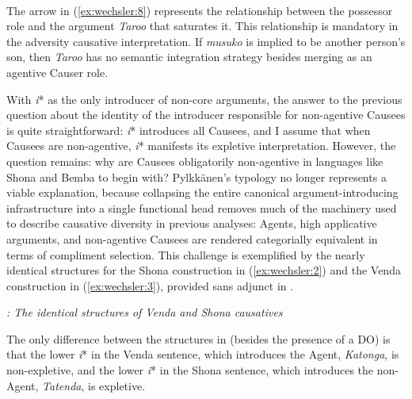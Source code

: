 \documentclass[output=paper]{langscibook}
\begin{document}
\ea\label{ex:wechsler:8}
 \\
\z
                  

The arrow in (\ref{ex:wechsler:8}) represents the relationship between the possessor role and the argument \textit{Taroo} that saturates it. This relationship is mandatory in the adversity causative interpretation. If \textit{musuko} is implied to be another person’s son, then \textit{Taroo} has no semantic integration strategy besides merging as an agentive Causer role. 

With \textit{i}* as the only introducer of non-core arguments, the answer to the previous question about the identity of the introducer responsible for non-agentive Causees is quite straightforward: \textit{i}* introduces all Causees, and I assume that when Causees are non-agentive, \textit{i}* manifests its expletive interpretation. However, the question remains: why are Causees obligatorily non-agentive in languages like Shona and Bemba to begin with? Pylkkänen’s typology no longer represents a viable explanation, because collapsing the entire canonical argument-introducing infrastructure into a single functional head removes much of the machinery used to describe causative diversity in previous analyses: Agents, high applicative arguments, and non-agentive Causees are rendered categorially equivalent in terms of compliment selection. This challenge is exemplified by the nearly identical structures for the Shona construction in (\ref{ex:wechsler:2}) and the Venda construction in (\ref{ex:wechsler:3}), provided sans adjunct in .
  
   

\textit{: The identical structures of Venda and Shona causatives} 

The only difference between the structures in  (besides the presence of a DO) is that the lower \textit{i}* in the Venda sentence, which introduces the Agent, \textit{Katonga}, is non-expletive, and the lower \textit{i}* in the Shona sentence, which introduces the non-Agent, \textit{Tatenda}, is expletive. 
\end{document}
